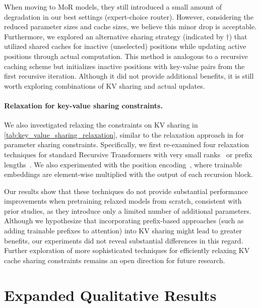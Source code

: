 When moving to MoR models, they still introduced a small amount of degradation in our best settings (expert-choice router). However, considering the reduced parameter sizes and cache sizes, we believe this minor drop is acceptable. Furthermore, we explored an alternative sharing strategy (indicated by $\dagger$) that utilized shared caches for inactive (unselected) positions while updating active positions through actual computation. This method is analogous to a recursive caching scheme but initializes inactive positions with key-value pairs from the first recursive iteration. Although it did not provide additional benefits, it is still worth exploring combinations of KV sharing and actual updates.





\clearpage

\paragraph{Relaxation for key-value sharing constraints.}
We also investigated relaxing the constraints on KV sharing in \autoref{tab:key_value_sharing_relaxation}, similar to the relaxation approach in \citet{bae2024relaxed} for parameter sharing constraints. Specifically, we first re-examined four relaxation techniques for standard Recursive Transformers with very small ranks~\citep{hu2022lora, liu2024dora} or prefix lengths~\citep{liu2021p}. We also experimented with the position encoding~\citep{chen2025inner}, where trainable embeddings are element-wise multiplied with the output of each recursion block. 

Our results show that these techniques do not provide substantial performance improvements when pretraining relaxed models from scratch, consistent with prior studies, as they introduce only a limited number of additional parameters. Although we hypothesize that incorporating prefix-based approaches (such as adding trainable prefixes to attention) into KV sharing might lead to greater benefits, our experiments did not reveal substantial differences in this regard. Further exploration of more sophisticated techniques for efficiently relaxing KV cache sharing constraints remains an open direction for future research.






\section{Expanded Qualitative Results}
\label{app:qualitative_results}


